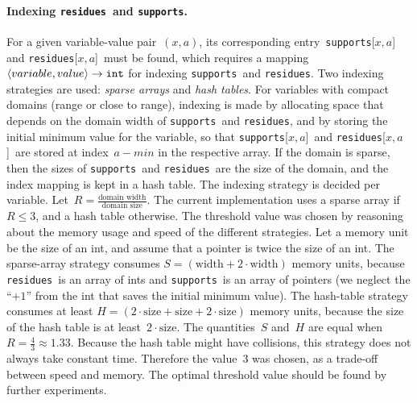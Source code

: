 \documentclass[a4paper,11pt]{article}
\newcommand{\Todo}[1]{{\color{blue}#1}}
\newcommand{\CurrTable}{\texttt{validTuples}}
\newcommand{\Supports}{\texttt{supports}}
\newcommand{\Residues}{\texttt{residues}}
\numberwithin{equation}{section}
\begin{document}
\paragraph{Indexing \Residues~and \Supports.}
For a given variable-value pair~$(x,a)$, its corresponding entry~\Supports[$x,a$]
and \Residues[$x,a$]~must be found, which requires a mapping
$\left\langle variable,value\right\rangle \to \texttt{int}$ for indexing \Supports~and \Residues.
Two indexing strategies are used: \emph{sparse arrays} and \emph{hash tables}.
For variables with compact domains (range or close to range),
indexing is made by allocating space that depends on the domain width of
\Supports~and \Residues, and by storing the initial minimum value for the variable,
so that \Supports[$x,a$]~and \Residues[$x,a$]~are stored at index~$a - min$ in
the respective array. If the domain is sparse,
then the sizes of \Supports~and \Residues~are the size of the domain, and the index mapping
is kept in a hash table.
The indexing strategy is decided per variable.
Let~$R = \frac{\text{domain width}}{\text{domain size}}$.
The current implementation uses a sparse array if~$R \leq 3$, and a hash table
otherwise.
The threshold value was chosen by reasoning about the memory usage and speed
of the different strategies.
Let a memory unit be the size of an int, and assume that a pointer is twice
the size of an int. The sparse-array 
strategy consumes $S = (\text{width} + 2 \cdot \text{width})$ memory units,
because \Residues~is an array of ints and \Supports~is an array of pointers
(we neglect the ``$+1$'' from the int that saves the initial minimum value).
The hash-table strategy consumes at least
$H = (2 \cdot \text{size} + \text{size} + 2 \cdot \text{size})$
memory units, because the size of the hash table 
is at least~$2 \cdot \text{size}$.
The quantities~$S$ and~$H$ are equal when~$R = \frac{4}{3} \approx 1.33$.
Because the hash table might have collisions, this strategy does not always
take constant time. Therefore the value~$3$ was chosen, as a trade-off between
speed and memory. The optimal threshold value should be found by further
experiments.

\end{document}
